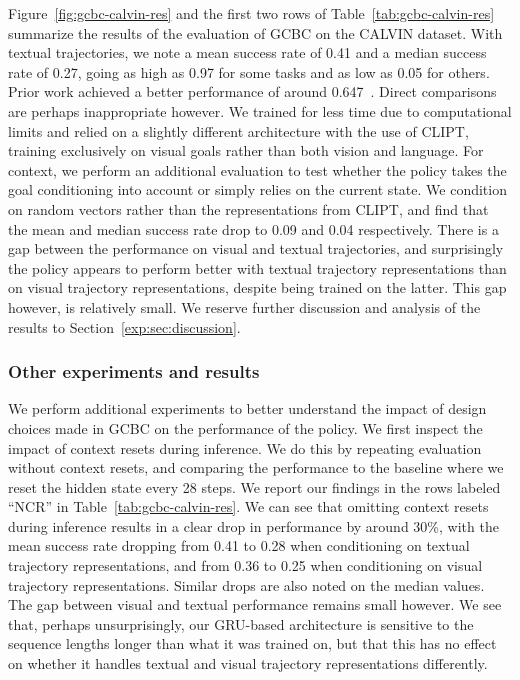 \documentclass[../main.tex]{subfiles}
\begin{document}
Figure~\ref{fig:gcbc-calvin-res} and the first two rows of Table~\ref{tab:gcbc-calvin-res} summarize
the results of the evaluation of GCBC on the CALVIN dataset. With textual trajectories, we note
a mean success rate of 0.41 and a median success rate of 0.27, going as high as 0.97 for some tasks
and as low as 0.05 for others. Prior work achieved a better performance of around
0.647~\citep{mees_calvin_2022}. Direct comparisons are perhaps inappropriate however. We trained for
less time due to computational limits and relied on a slightly different architecture with the use
of CLIPT, training exclusively on visual goals rather than both vision and language. For context,
we perform an additional evaluation to test whether the policy takes the goal conditioning into
account or simply relies on the current state. We condition on random vectors rather than the
representations from CLIPT, and find that the mean and median success rate drop to
0.09 and 0.04 respectively. There is a gap between the performance on visual and textual
trajectories, and surprisingly the policy appears to perform better with textual trajectory
representations than on visual trajectory representations, despite being trained on the latter.
This gap however, is relatively small. We reserve further discussion and analysis of the results
to Section~\ref{exp:sec:discussion}.

\subsubsection{Other experiments and results}

We perform additional experiments to better understand the impact of design choices made in GCBC on
the performance of the policy. We first inspect the impact of context resets during inference. We do
this by repeating evaluation without context resets, and comparing the performance to the baseline
where we reset the hidden state every 28 steps. We report our findings in the rows labeled ``NCR''
in Table~\ref{tab:gcbc-calvin-res}. We can see that omitting context resets during inference results
in a clear drop in performance by around 30\%, with the mean success rate dropping from 0.41 to 0.28
when conditioning on textual trajectory representations, and from 0.36 to 0.25 when conditioning on
visual trajectory representations. Similar drops are also noted on the median values. The gap
between visual and textual performance remains small however. We see that, perhaps unsurprisingly,
our GRU-based architecture is sensitive to the sequence lengths longer than what it was trained on,
but that this has no effect on whether it handles textual and visual trajectory representations
differently.
\end{document}
